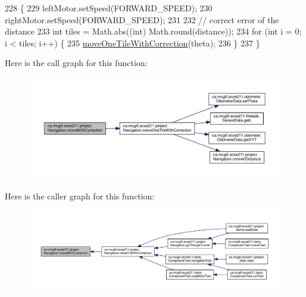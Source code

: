 \begin{DoxyCode}
228                                                                              \{
229     leftMotor.setSpeed(FORWARD\_SPEED);
230     rightMotor.setSpeed(FORWARD\_SPEED);
231 
232     \textcolor{comment}{// correct error of the distance}
233     \textcolor{keywordtype}{int} tiles = Math.abs((\textcolor{keywordtype}{int}) Math.round(distance));
234     \textcolor{keywordflow}{for} (\textcolor{keywordtype}{int} i = 0; i < tiles; i++) \{
235       \hyperlink{classca_1_1mcgill_1_1ecse211_1_1project_1_1_navigation_afbe677941e2bd44e35452e1eff508ae9}{moveOneTileWithCorrection}(theta);
236     \}
237   \}
\end{DoxyCode}
Here is the call graph for this function\+:
\nopagebreak
\begin{figure}[H]
\begin{center}
\leavevmode
\includegraphics[width=350pt]{classca_1_1mcgill_1_1ecse211_1_1project_1_1_navigation_a48eeb9ae2da23664421e8da5642054c7_cgraph}
\end{center}
\end{figure}
Here is the caller graph for this function\+:
\nopagebreak
\begin{figure}[H]
\begin{center}
\leavevmode
\includegraphics[width=350pt]{classca_1_1mcgill_1_1ecse211_1_1project_1_1_navigation_a48eeb9ae2da23664421e8da5642054c7_icgraph}
\end{center}
\end{figure}
\mbox{\label{classca_1_1mcgill_1_1ecse211_1_1project_1_1_navigation_a1a808e665b8dd5b8e79b0580724d239c}} 
